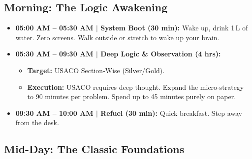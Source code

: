 \documentclass[12pt, a4paper]{article}
\begin{document}
\subsection{Morning: The Logic Awakening}

\begin{itemize}[leftmargin=2em, itemsep=6pt]

  \item \textbf{05:00 AM -- 05:30 AM $|$ System Boot (30 min):} Wake up, drink
        1\,L of water. Zero screens. Walk outside or stretch to wake up your
        brain.

  \item \textbf{05:30 AM -- 09:30 AM $|$ Deep Logic \& Observation (4 hrs):}
    \begin{itemize}
      \item \textbf{Target:} USACO Section-Wise (Silver/Gold).
      \item \textbf{Execution:} USACO requires deep thought. Expand the
            micro-strategy to 90 minutes per problem. Spend up to 45 minutes
            purely on paper.
    \end{itemize}

  \item \textbf{09:30 AM -- 10:00 AM $|$ Refuel (30 min):} Quick breakfast.
        Step away from the desk.

\end{itemize}

\subsection{Mid-Day: The Classic Foundations}
\end{document}
